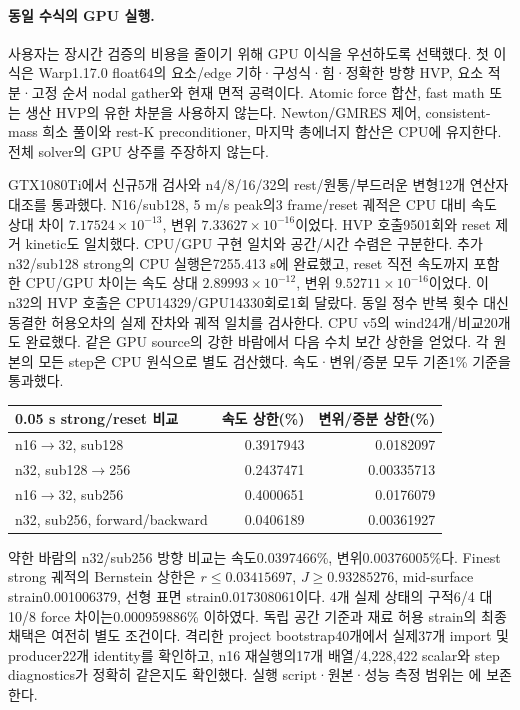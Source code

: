 \documentclass[10pt]{article}
\begin{document}
\paragraph{동일 수식의 GPU 실행.}
사용자는 장시간 검증의 비용을 줄이기 위해 GPU 이식을 우선하도록 선택했다.
첫 이식은 Warp1.17.0 float64의 요소/edge 기하·구성식·힘·정확한 방향 HVP,
요소 적분·고정 순서 nodal gather와 현재 면적 공력이다.
Atomic force 합산, fast math 또는 생산 HVP의 유한 차분을 사용하지 않는다.
Newton/GMRES 제어, consistent-mass 희소 풀이와 rest-K preconditioner,
마지막 총에너지 합산은 CPU에 유지한다. 전체 solver의 GPU 상주를 주장하지 않는다.

GTX1080Ti에서 신규5개 검사와 n4/8/16/32의 rest/원통/부드러운 변형12개 연산자 대조를 통과했다.
N16/sub128, 5 m/s peak의3 frame/reset 궤적은 CPU 대비 속도 상대 차이
\(7.17524\times10^{-13}\), 변위 \(7.33627\times10^{-16}\)이었다.
HVP 호출9501회와 reset 제거 kinetic도 일치했다. CPU/GPU 구현 일치와 공간/시간 수렴은 구분한다.
추가 n32/sub128 strong의 CPU 실행은7255.413 s에 완료했고, reset 직전 속도까지 포함한
CPU/GPU 차이는 속도 상대 \(2.89993\times10^{-12}\), 변위 \(9.52711\times10^{-16}\)이었다.
이 n32의 HVP 호출은 CPU14329/GPU14330회로1회 달랐다. 동일 정수 반복 횟수 대신 동결한
허용오차의 실제 잔차와 궤적 일치를 검사한다. CPU v5의 wind24개/비교20개도 완료했다.
같은 GPU source의 강한 바람에서 다음 수치 보간 상한을 얻었다. 각 원본의 모든 step은
CPU 원식으로 별도 검산했다. 속도·변위/증분 모두 기존1\% 기준을 통과했다.
\begin{center}
\begin{tabular}{lrr}
\toprule
0.05 s strong/reset 비교 & 속도 상한(\%) & 변위/증분 상한(\%)\\
\midrule
n16$\to$32, sub128 & 0.3917943 & 0.0182097\\
n32, sub128$\to$256 & 0.2437471 & 0.00335713\\
n16$\to$32, sub256 & 0.4000651 & 0.0176079\\
n32, sub256, forward/backward & 0.0406189 & 0.00361927\\
\bottomrule
\end{tabular}
\end{center}
약한 바람의 n32/sub256 방향 비교는 속도0.0397466\%, 변위0.00376005\%다.
Finest strong 궤적의 Bernstein 상한은 \(r\le0.03415697\), \(J\ge0.93285276\),
mid-surface strain0.001006379, 선형 표면 strain0.017308061이다.
4개 실제 상태의 구적6/4 대10/8 force 차이는0.000959886\% 이하였다.
독립 공간 기준과 재료 허용 strain의 최종 채택은 여전히 별도 조건이다.
격리한 project bootstrap40개에서 실제37개 import 및 producer22개 identity를 확인하고,
n16 재실행의17개 배열/4,228,422 scalar와 step diagnostics가 정확히 같은지도 확인했다.
실행 script·원본·성능 측정 범위는
에 보존한다.
\end{document}
